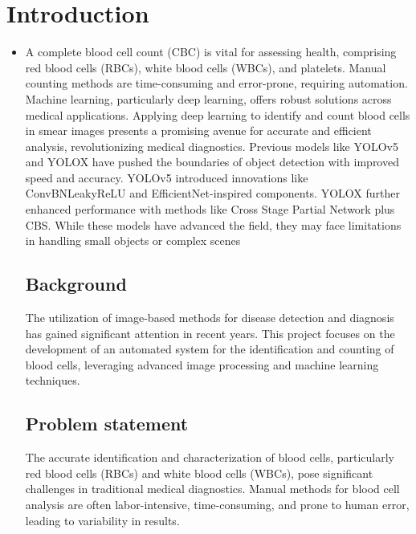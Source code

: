 \chapter{Introduction}
\label{ch:into} %

\begin{itemize}
    \item A complete blood cell count (CBC) is vital for assessing health, comprising red blood cells (RBCs), white blood cells (WBCs), and platelets. Manual counting methods are time-consuming and error-prone, requiring automation. Machine learning, particularly deep learning, offers robust solutions across medical applications. Applying deep learning to identify and count blood cells in smear images presents a promising avenue for accurate and efficient analysis, revolutionizing medical diagnostics. Previous models like YOLOv5 and YOLOX have pushed the boundaries of object detection with improved speed and accuracy. YOLOv5 introduced innovations like ConvBNLeakyReLU and EfficientNet-inspired components. YOLOX further enhanced performance with methods like Cross Stage Partial Network plus CBS. While these models have advanced the field, they may face limitations in handling small objects or complex scenes
       

\section{Background}
\label{sec:into_back}
The utilization of image-based methods for disease detection and diagnosis has gained significant attention in recent years. This project focuses on the development of an automated system for the identification and counting of blood cells, leveraging advanced image processing and machine learning techniques.

\section{Problem statement}
\label{sec:intro_prob_art}
The accurate identification and characterization of blood cells, particularly red blood cells (RBCs) and white blood cells (WBCs), pose significant challenges in traditional medical diagnostics. Manual methods for blood cell analysis are often labor-intensive, time-consuming, and prone to human error, leading to variability in results.

\end{itemize}
